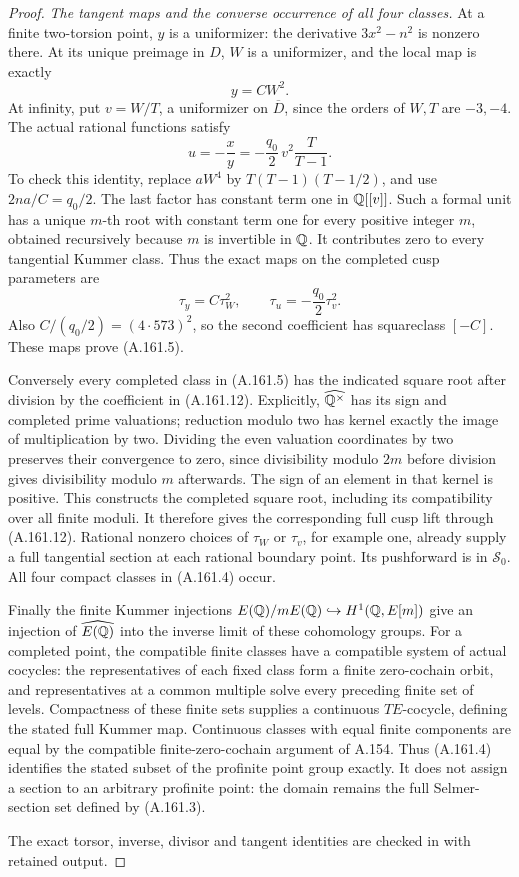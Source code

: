 \begin{proof}
\emph{The tangent maps and the converse occurrence of all four classes.}
At a finite two-torsion point, \(y\) is a uniformizer:
the derivative \(3x^2-n^2\) is nonzero there.
At its unique preimage in \(D\), \(W\) is a
uniformizer, and the local map is exactly
\[
                                 y=CW^2.
\tag{A.161.10}
\]
At infinity, put \(v=W/T\), a uniformizer on
\(\overline D\), since the orders of \(W,T\) are
\(-3,-4\).  The actual rational functions satisfy
\[
          u=-\frac{x}{y}
            =-\frac{q_0}{2}\,v^2\frac{T}{T-1}.
\tag{A.161.11}
\]
To check this identity, replace \(aW^4\) by
\(T(T-1)(T-1/2)\), and use
\(2na/C=q_0/2\).  The last factor has constant
term one in \(\mathbb Q[[v]]\).  Such a formal unit has
a unique \(m\)-th root with constant term one for
every positive integer \(m\), obtained recursively
because \(m\) is invertible in \(\mathbb Q\).  It
contributes zero to every tangential Kummer class.
Thus the exact maps on the completed cusp parameters
are
\[
               \tau_y=C\tau_W^2,
               \qquad \tau_u=-\frac{q_0}{2}\tau_v^2.
\tag{A.161.12}
\]
Also \(C/(q_0/2)=(4\cdot573)^2\), so the second
coefficient has squareclass \([-C]\).  These maps
prove (A.161.5).

Conversely every completed class in (A.161.5) has
the indicated square root after division by the
coefficient in (A.161.12).  Explicitly,
\(\widehat{\mathbb Q^\times}\) has its sign and completed
prime valuations; reduction modulo two has kernel
exactly the image of multiplication by two.
Dividing the even valuation coordinates by two
preserves their convergence to zero, since
divisibility modulo \(2m\) before division gives
divisibility modulo \(m\) afterwards.  The sign
of an element in that kernel is positive.  This
constructs the completed square root, including
its compatibility over all finite moduli.
It therefore gives the corresponding full cusp
lift through (A.161.12).  Rational nonzero choices
of \(\tau_W\) or \(\tau_v\), for example one,
already supply a full tangential section at each
rational boundary point.  Its pushforward is in
\(\mathcal S_0\).  All four compact classes in
(A.161.4) occur.

Finally the finite Kummer injections
\(E(\mathbb Q)/mE(\mathbb Q)\hookrightarrow H^1(\mathbb Q,E[m])\)
give an injection of \(\widehat{E(\mathbb Q)}\) into
the inverse limit of these cohomology groups.
For a completed point, the compatible finite classes
have a compatible system of actual cocycles: the
representatives of each fixed class form a finite
zero-cochain orbit, and representatives at a common
multiple solve every preceding finite set of levels.
Compactness of these finite sets supplies a continuous
\(TE\)-cocycle, defining the stated full Kummer map.
Continuous classes with equal finite components
are equal by the compatible finite-zero-cochain
argument of A.154.  Thus (A.161.4) identifies the
stated subset of the profinite point group exactly.
It does not assign a section to an arbitrary
profinite point: the domain remains the full
Selmer-section set defined by (A.161.3).

The exact torsor, inverse, divisor and tangent
identities are checked in
with retained output.
\end{proof}
